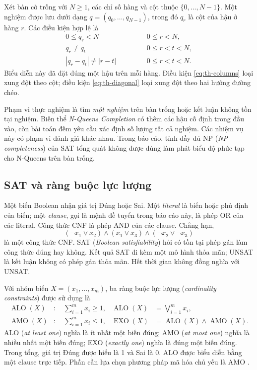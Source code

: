 Xét bàn cờ trống với $N\geq 1$, các chỉ số hàng và cột thuộc
$\{0,\ldots,N-1\}$. Một nghiệm được lưu dưới dạng
$q=(q_0,\ldots,q_{N-1})$, trong đó $q_r$ là cột của hậu ở hàng $r$.
Các điều kiện hợp lệ là
\begin{align}
0\leq q_r<N &\qquad &&0\leq r<N, \label{eq:th-domain}\\
q_r\neq q_t &\qquad &&0\leq r<t<N, \label{eq:th-columns}\\
|q_r-q_t|\neq |r-t| &\qquad &&0\leq r<t<N. \label{eq:th-diagonal}
\end{align}
Biểu diễn này đã đặt đúng một hậu trên mỗi hàng. Điều kiện
\eqref{eq:th-columns} loại xung đột theo cột; điều kiện
\eqref{eq:th-diagonal} loại xung đột theo hai hướng đường chéo.

Phạm vi thực nghiệm là tìm \emph{một nghiệm} trên bàn trống hoặc kết
luận không tồn tại nghiệm. Biến thể \emph{N-Queens Completion} có thêm
các hậu cố định trong đầu vào, còn bài toán đếm yêu cầu xác định số
lượng tất cả nghiệm. Các nhiệm vụ này có phạm vi đánh giá khác nhau.
Trong báo cáo, tính đầy đủ NP (\emph{NP-completeness}) của SAT tổng
quát không được dùng làm phát biểu độ phức tạp cho N-Queens trên bàn trống.

\subsection{SAT và ràng buộc lực lượng}

Một biến Boolean nhận giá trị Đúng hoặc Sai. Một \emph{literal} là biến
hoặc phủ định của biến; một \emph{clause}, gọi là mệnh đề tuyển trong báo
cáo này, là phép OR của các literal. Công thức CNF là phép AND của các
clause. Chẳng hạn,
\begin{equation}
 (\neg x_1\lor x_2)\land(x_1\lor x_3)\land(\neg x_2\lor\neg x_3)
\end{equation}
là một công thức CNF. SAT (\emph{Boolean satisfiability}) hỏi có tồn tại
phép gán làm công thức đúng hay không. Kết quả SAT đi kèm một mô hình
thỏa mãn; UNSAT là kết luận không có phép gán thỏa mãn. Hết thời gian
không đồng nghĩa với UNSAT.

Với nhóm biến $X=(x_1,\ldots,x_m)$, ba ràng buộc lực lượng
(\emph{cardinality constraints}) được sử dụng là
\begin{align}
\operatorname{ALO}(X)&:\quad \sum_{i=1}^{m}x_i\geq 1,
&\operatorname{ALO}(X)&=\bigvee_{i=1}^{m}x_i,\label{eq:th-alo}\\
\operatorname{AMO}(X)&:\quad \sum_{i=1}^{m}x_i\leq 1,
&\operatorname{EXO}(X)&=\operatorname{ALO}(X)\land\operatorname{AMO}(X).
\label{eq:th-exo}
\end{align}
ALO (\emph{at least one}) nghĩa là ít nhất một biến đúng; AMO
(\emph{at most one}) nghĩa là nhiều nhất một biến đúng; EXO
(\emph{exactly one}) nghĩa là đúng một biến đúng. Trong tổng, giá trị Đúng
được hiểu là 1 và Sai là 0. ALO được biểu diễn bằng một clause trực tiếp.
Phần cần lựa chọn phương pháp mã hóa chủ yếu là AMO \cite{module3}.

